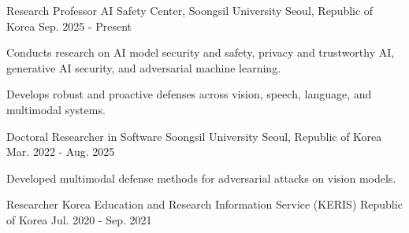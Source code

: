 
\begin{cventries}
  \cventry
    {Research Professor}
    {AI Safety Center, Soongsil University}
    {Seoul, Republic of Korea}
    {Sep. 2025 - Present}
    {
      \begin{cvitems}
        \item {Conducts research on AI model security and safety, privacy and trustworthy AI, generative AI security, and adversarial machine learning.}
        \item {Develops robust and proactive defenses across vision, speech, language, and multimodal systems.}
      \end{cvitems}
    }

  \cventry
    {Doctoral Researcher in Software}
    {Soongsil University}
    {Seoul, Republic of Korea}
    {Mar. 2022 - Aug. 2025}
    {
      \begin{cvitems}
        \item {Developed multimodal defense methods for adversarial attacks on vision models.}
      \end{cvitems}
    }

  \cventry
    {Researcher}
    {Korea Education and Research Information Service (KERIS)}
    {Republic of Korea}
    {Jul. 2020 - Sep. 2021}
    {}
\end{cventries}
